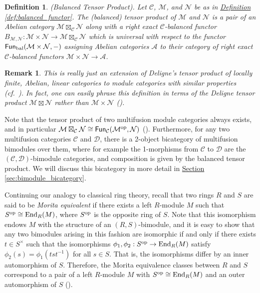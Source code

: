 \documentclass[12pt, reqno]{amsart}
\numberwithin{equation}{section}
\theoremstyle{plainspace}
\theoremstyle{definitionspace}
\newtheorem{definition}[theorem]{Definition}
\theoremstyle{remarkspace}
\newtheorem{remark}[theorem]{Remark}
\newcommand{\mathcat}[1]{\mathcal{#1}}
\newcommand{\End}[2][]{
	\ifthenelse{\equal{#2}{}}
		{\textup{End}_{#1}}
		{\textup{End}_{#1}\!\left(#2\right)}
}
\newcommand{\Fun}[2][]{
	\ifthenelse{\equal{#2}{}}
		{\textcat{Fun}_{#1}}
		{\textcat{Fun}_{#1}\!\left(#2\right)}
}
\newcommand{\opcat}[1]{{#1}^{\textup{op}}}
\newcommand{\textcat}[1]{\textup{\textsf{#1}}}
\begin{document}
\begin{definition}\label{def:balanced_tensor_product}{\em (Balanced Tensor Product).} \cite[Definition 3.3]{Etingof_2010}
Let $\mathcat{C}$, $\mathcat{M}$, and $\mathcat{N}$ be as in \hyperref[def:balanced_functor]{Definition \ref*{def:balanced_functor}}. The {\em (balanced) tensor product} of $\mathcat{M}$ and $\mathcat{N}$ is a pair of an Abelian category $\mathcat{M} \boxtimes_{\mathcat{C}} \mathcat{N}$ along with a right exact $\mathcat{C}$-balanced functor $B_{\mathcat{M},\mathcat{N}} : \mathcat{M} \times \mathcat{N} \to \mathcat{M} \boxtimes_{\mathcat{C}} \mathcat{N}$ which is universal with respect to the functor $\Fun[\textup{bal}]{\mathcat{M} \times \mathcat{N}, -}$ assigning Abelian categories $\mathcat{A}$ to their category of right exact $\mathcat{C}$-balanced functors $\mathcat{M} \times \mathcat{N} \to \mathcat{A}$.
\end{definition}
\leavevmode

\begin{remark}\label{rem:deligne_tensor_product}
This is really just an extension of Deligne's tensor product of locally finite, Abelian, linear categories to module categories with similar properties (cf.\ \cite[Definition 1.11.1]{Etingof_2016}). In fact, one can easily phrase this definition in terms of the Deligne tensor product $\mathcat{M} \boxtimes \mathcat{N}$ rather than $\mathcat{M} \times \mathcat{N}$ (\cite[Remark 3.2]{Etingof_2010}).
\end{remark}
\leavevmode

\noindent Note that the tensor product of two multifusion module categories always exists, and in particular $\mathcat{M} \boxtimes_{\mathcat{C}} \mathcat{N} \cong \Fun[\mathcat{C}]{\opcat{\mathcat{M}}, \mathcat{N}}$ (\cite[Proposition 3.5]{Etingof_2010}). Furthermore, for any two multifusion categories $\mathcat{C}$ and $\mathcat{D}$, there is a 2-object bicategory of multifusion bimodules over them, where for example the 1-morphisms from $\mathcat{C}$ to $\mathcat{D}$ are the $(\mathcat{C}, \mathcat{D})$-bimodule categories, and composition is given by the balanced tensor product. We will discuss this bicategory in more detail in \hyperref[sec:bimodule_bicategory]{Section \ref*{sec:bimodule_bicategory}}.
\newline

\noindent Continuing our analogy to classical ring theory, recall that two rings $R$ and $S$ are said to be {\em Morita equivalent} if there exists a left $R$-module $M$ such that $\opcat{S} \cong \End[R]{M}$, where $\opcat{S}$ is the opposite ring of $S$. Note that this isomorphism endows $M$ with the structure of an $(R, S)$-bimodule, and it is easy to show that any two bimodules arising in this fashion are isomorphic if and only if there exists $t \in S^{\times}$ such that the isomorphisms $\phi_1, \phi_2 : \opcat{S} \to \End[R]{M}$ satisfy $\phi_2(s) = \phi_1(tst^{-1})$ for all $s \in S$. That is, the isomorphisms differ by an inner automorphism of $S$. Therefore, the Morita equivalence classes between $R$ and $S$ correspond to a pair of a left $R$-module $M$ with $\opcat{S} \cong \End[R]{M}$ and an outer automorphism of $S$ (\cite[Section 2.2]{Grossman_2012}).
\newline
\end{document}
